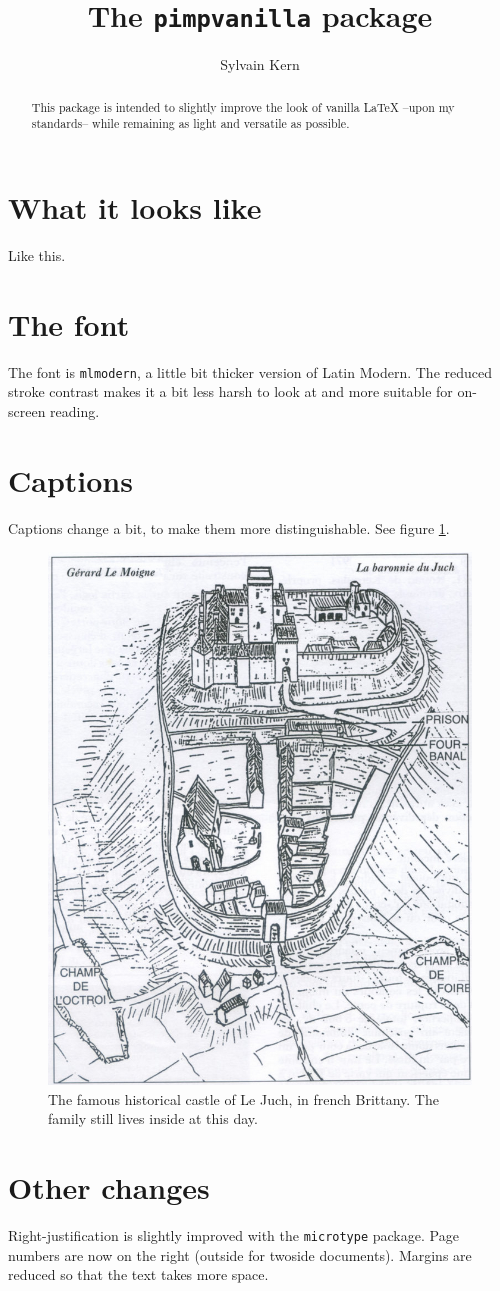 \documentclass[12pt]{article}
\title{The \texttt{pimpvanilla} package}
\author{Sylvain Kern}
\begin{document}
\maketitle

\begin{abstract}
    This package is intended to slightly improve the look of vanilla \LaTeX{} --upon my standards-- while remaining as light and versatile as possible.
\end{abstract}

\section{What it looks like}

Like this. \lipsum[1-2]

\section{The font}

The font is \texttt{mlmodern}, a little bit thicker version of Latin Modern. The reduced stroke contrast makes it a bit less harsh to look at and more suitable for on-screen reading.

\section{Captions}

Captions change a bit, to make them more distinguishable. See figure \ref{fig:juch}.

\begin{figure}
    \centering
    \includegraphics[width=.75\linewidth]{lejuch.png}
    \caption{The famous historical castle of Le Juch, in french Brittany. The family still lives inside at this day. \lipsum[3] \label{fig:juch}}
\end{figure}


\section{Other changes}

Right-justification is slightly improved with the \texttt{microtype} package. Page numbers are now on the right (outside for twoside documents). Margins are reduced so that the text takes more space.
\end{document}
